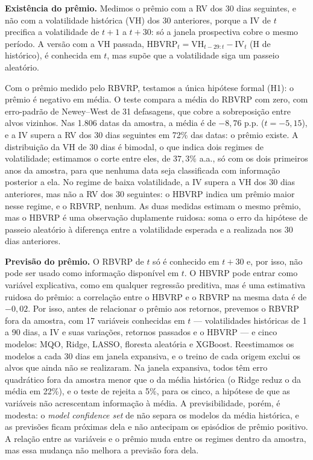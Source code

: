 \noindent\textbf{Existência do prêmio.} Medimos o prêmio com a RV dos 30 dias
seguintes, e não com a volatilidade histórica (VH) dos 30 anteriores, porque a
IV de $t$ precifica a volatilidade de $t+1$ a $t+30$: só a janela prospectiva
cobre o mesmo período. A versão com a VH passada,
$\text{HBVRP}_t = \text{VH}_{t-29:t} - \text{IV}_t$ (H de histórico), é
conhecida em $t$, mas supõe que a volatilidade siga um passeio aleatório.

Com o prêmio medido pelo RBVRP, testamos a única hipótese formal
(H1): o prêmio é negativo em média. O teste compara a média do RBVRP com zero,
com erro-padrão de Newey--West de 31 defasagens, que cobre a sobreposição entre
alvos vizinhos.
Nas 1.806 datas da amostra, a média é de $-8{,}76$ p.p. ($t = -5{,}15$), e a IV
supera a RV dos 30 dias seguintes em 72\% das datas: o prêmio existe. A
distribuição da VH de 30 dias é bimodal, o que indica dois regimes de
volatilidade; estimamos o corte entre eles, de $37{,}3\%$ a.a., só
com os dois primeiros anos da amostra, para que nenhuma data seja classificada
com informação posterior a ela. No regime de baixa volatilidade, a IV supera a VH
dos 30 dias anteriores, mas não a RV dos 30 seguintes: o HBVRP indica um
prêmio maior nesse regime, e o RBVRP, nenhum. As duas medidas estimam o mesmo
prêmio, mas o HBVRP é uma observação duplamente ruidosa: soma o erro da
hipótese de passeio aleatório à diferença entre a volatilidade esperada e a
realizada nos 30 dias anteriores.

\noindent\textbf{Previsão do prêmio.} O RBVRP de $t$ só é conhecido em $t+30$ e,
por isso, não pode ser usado como informação disponível em $t$. O HBVRP pode
entrar como variável explicativa, como em qualquer regressão preditiva, mas é
uma estimativa ruidosa do prêmio: a correlação entre o HBVRP e o RBVRP na
mesma data é de $-0{,}02$. Por isso, antes de relacionar o prêmio aos retornos,
prevemos o RBVRP fora da amostra, com 17 variáveis conhecidas em
$t$ --- volatilidades históricas de 1 a 90 dias, a IV e suas variações,
retornos passados e o HBVRP --- e cinco modelos: MQO,
Ridge, LASSO, floresta aleatória e XGBoost. Reestimamos os modelos a
cada 30 dias em janela expansiva, e o treino de cada origem exclui os alvos que
ainda não se realizaram. Na janela expansiva, todos têm erro quadrático fora
da amostra menor que o da média histórica (o Ridge reduz o da média em 22\%), e
o teste de \citet{clark2007approximately} rejeita a 5\%, para os cinco, a
hipótese de que as variáveis não acrescentam informação à média. A
previsibilidade, porém, é modesta: o \textit{model confidence set} de
\citet{hansen2011model} não separa os modelos da média histórica, e as
previsões ficam próximas dela e não antecipam os episódios de prêmio positivo. A relação
entre as variáveis e o prêmio muda entre os regimes dentro da amostra, mas essa
mudança não melhora a previsão fora dela.

